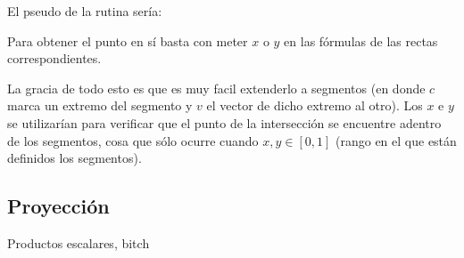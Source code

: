 \documentclass{article}
\begin{document}
El pseudo de la rutina sería:

Para obtener el punto en sí basta con meter $x$ o $y$ en las fórmulas de las rectas correspondientes.

La gracia de todo esto es que es muy facil extenderlo a segmentos (en donde $c$ marca un extremo del segmento y $v$ el vector de dicho extremo al otro). Los $x$ e $y$ se utilizarían para verificar que el punto de la intersección se encuentre adentro de los segmentos, cosa que sólo ocurre cuando $x, y \in [0, 1]$ (rango en el que están definidos los segmentos).

\subsection*{Proyección}

Productos escalares, bitch
\end{document}
